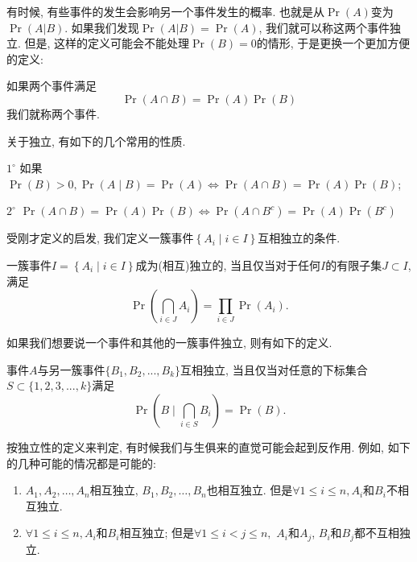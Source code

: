 \documentclass{ctexart}
\begin{document}
有时候, 有些事件的发生会影响另一个事件发生的概率. 也就是从$\Pr(A)$变为$\Pr(A|B)$. 如果我们发现$\Pr(A|B)=\Pr(A)$, 我们就可以称这两个事件独立. 
但是, 这样的定义可能会不能处理$\Pr(B)=0$的情形, 于是更换一个更加方便的定义:

\begin{definition}[两个事件的独立性]
    如果两个事件满足
    $$
\operatorname{Pr}(A \cap B)=\operatorname{Pr}(A) \operatorname{Pr}(B)
$$
我们就称两个事件. 
    
\end{definition}

关于独立, 有如下的几个常用的性质. 

$1^\circ$ 如果$\Pr(B)>0, \operatorname{Pr}(A \mid B)=\operatorname{Pr}(A) \Longleftrightarrow \operatorname{Pr}(A \cap B)=\operatorname{Pr}(A) \operatorname{Pr}(B)$;

$2^\circ$ $\operatorname{Pr}(A \cap B)=\operatorname{Pr}(A) \operatorname{Pr}(B) \Longleftrightarrow \operatorname{Pr}\left(A \cap B^c\right)=\operatorname{Pr}(A) \operatorname{Pr}\left(B^c\right)$

受刚才定义的启发, 我们定义一簇事件$\left\{A_i \mid i \in I\right\}$互相独立的条件. 

\begin{definition}
    一簇事件$I=\left\{A_i \mid i \in I\right\}$成为(相互)独立的, 当且仅当对于任何$I$的有限子集$J\subset I$, 满足
    $$\operatorname{Pr}\left(\bigcap_{i \in J} A_i\right)=\prod_{i \in J} \operatorname{Pr}\left(A_i\right).$$
\end{definition}

如果我们想要说一个事件和其他的一簇事件独立, 则有如下的定义. 

\begin{definition}
    事件$A$与另一簇事件$\{ B_1, B_2, ..., B_k \}$互相独立, 当且仅当对任意的下标集合$S\subset \{1,2,3, ..., k\}$满足
    \[
        \Pr \left( B \mid \bigcap_{i\in S} B_i  \right) = \Pr(B).
    \]
\end{definition}

按独立性的定义来判定, 有时候我们与生俱来的直觉可能会起到反作用. 例如, 如下的几种可能的情况都是可能的: 
\begin{enumerate}
    \item $A_1, A_2, \ldots, A_n$相互独立, $B_1, B_2, \ldots, B_n$也相互独立. 但是$\forall 1\leq i\leq n, A_i$和$B_i$不相互独立.
    \item $\forall 1\leq i\leq n, A_i$和$B_i$相互独立; 但是$\forall 1\leq i<j\leq n,$ $A_i$和$A_j$, $B_i$和$B_j$都不互相独立.  
\end{enumerate}
\end{document}
